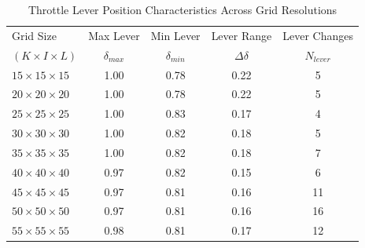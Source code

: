 \begin{table}[h]
    \centering
    \footnotesize
    \begin{tabular}{l c c c c}
        \hline
        Grid Size & Max Lever & Min Lever & Lever Range & Lever Changes \\
        $(K \times I \times L)$ & $\delta_{max}$ & $\delta_{min}$ & $\Delta\delta$ & $N_{lever}$ \\
        \hline
        $15 \times 15 \times 15$ & 1.00 & 0.78 & 0.22 & 5 \\
        $20 \times 20 \times 20$ & 1.00 & 0.78 & 0.22 & 5 \\
        $25 \times 25 \times 25$ & 1.00 & 0.83 & 0.17 & 4 \\
        $30 \times 30 \times 30$ & 1.00 & 0.82 & 0.18 & 5 \\
        $35 \times 35 \times 35$ & 1.00 & 0.82 & 0.18 & 7 \\
        $40 \times 40 \times 40$ & 0.97 & 0.82 & 0.15 & 6 \\
        $45 \times 45 \times 45$ & 0.97 & 0.81 & 0.16 & 11 \\
        $50 \times 50 \times 50$ & 0.97 & 0.81 & 0.16 & 16 \\
        $55 \times 55 \times 55$ & 0.98 & 0.81 & 0.17 & 12 \\
        \hline
    \end{tabular}
    \caption{Throttle Lever Position Characteristics Across Grid Resolutions}
    \label{ThrottleLeverPositionCharacteristicsAcrossGridResolutions}
\end{table}



